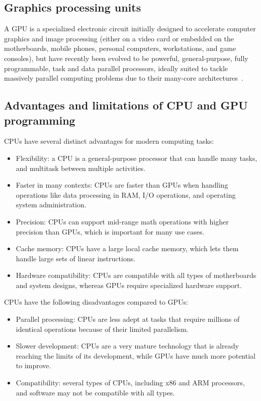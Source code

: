 \subsection{Graphics processing units}


\par
A GPU is a specialized electronic circuit initially designed to accelerate computer graphics and image processing (either on a video card or embedded on the motherboards, mobile phones, personal computers, workstations, and game consoles), but have recently been evolved to be powerful, general-purpose, fully programmable, task and data parallel processors, ideally suited to tackle massively parallel computing problems due to their many-core architectures~\cite{gpu_wiki}.




\subsection{Advantages and limitations of CPU and GPU programming}


\par
CPUs have several distinct advantages for modern computing tasks:
\begin{itemize}
    \item Flexibility: a CPU is a general-purpose processor that can handle many tasks, and multitask between multiple activities.
    \item Faster in many contexts: CPUs are faster than GPUs when handling operations like data processing in RAM, I/O operations, and operating system administration.
    \item Precision: CPUs can support mid-range math operations with higher precision than GPUs, which is important for many use cases.
    \item Cache memory: CPUs have a large local cache memory, which lets them handle large sets of linear instructions.
    \item Hardware compatibility: CPUs are compatible with all types of motherboards and system designs, whereas GPUs require specialized hardware support.
\end{itemize}


CPUs have the following disadvantages compared to GPUs:
\begin{itemize}
    \item Parallel processing: CPUs are less adept at tasks that require millions of identical operations because of their limited parallelism.
    \item Slower development: CPUs are a very mature technology that is already reaching the limits of its development, while GPUs have much more potential to improve.
    \item Compatibility: several types of CPUs, including x86 and ARM processors, and software may not be compatible with all types.
\end{itemize}


